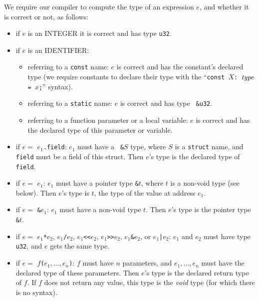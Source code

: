 We require our compiler to compute the type of an expression $e$, and whether
it is correct or not, as follows:
\begin{itemize}
  \item if $e$ is an INTEGER it is correct and has type {\tt u32}.

  \item if $e$ is an IDENTIFIER:
  \begin{itemize}
    \item referring to a {\tt const} name: $e$ is correct and has the
    constant's declared type (we require constants to declare their type with
    the ``{\tt const $X$: $\it{type}$ = $x$;}'' syntax).

    \item referring to a {\tt static} name: $e$ is correct and has type {\tt
    \&u32}.

    \item referring to a function parameter or a local variable: $e$ is correct
    and has the declared type of this parameter or variable.
  \end{itemize}

  \item if $e=$ {\tt $e_1$.field}: $e_1$ must have a {\tt
  \&$S$} type, where $S$ is a {\tt struct} name, and {\tt field} must be a field
  of this struct. Then $e$'s type is the declared type of {\tt field}.

  \item if $e=$ {\tt *$e_1$}: $e_1$ must have a pointer type {\tt \&$t$}, where
  $t$ is a non-void type (see below). Then $e$'s type is $t$, the type of the
  value at address $e_1$.

  \item if $e=$ {\tt \&$e_1$}: $e_1$ must have a non-void type $t$. Then $e$'s
  type is the pointer type {\tt \&$t$}.

  \item if $e=$ {\tt $e_1$*$e_2$}, {\tt $e_1$/$e_2$}, {\tt $e_1${<}{<}$e_2$},
  {\tt $e_1${>}{>}$e_2$}, {\tt $e_1$\&$e_2$}, or {\tt $e_1$|$e_2$}: $e_1$ and
  $e_2$ must have type {\tt u32}, and $e$ gets the same type.

  \item if $e=$ {\tt $f$($e_1,\ldots,e_n$)}: $f$ must have $n$ parameters, and
  $e_1,\ldots,e_n$ must have the declared type of these parameters. Then $e$'s
  type is the declared return type of $f$. If $f$ does not return any value,
  this type is the {\em void} type (for which there is no syntax).
\end{itemize}

